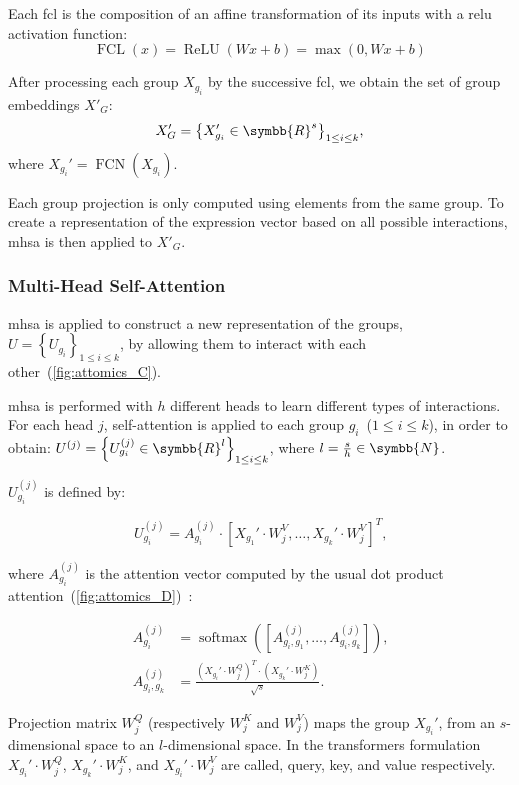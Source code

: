 \documentclass[../main.tex]{subfiles}
\begin{document}
			Each \gls{fcl} is the composition of an affine transformation of its inputs with a \gls{relu} activation function:
			\[ \operatorname{FCL}\left(x\right) = \operatorname{ReLU}\left(Wx+b \right) = \max\left(0, Wx+b\right) \]

			After processing each group \(X_{g_i}\) by the successive \gls{fcl}, we obtain the set of group embeddings \(X'_G\):
			\[ X_G' = {\left\{ X_{g_i}' \in \symbb{R}^{s}\right\}}_{1 \leq i \leq k} \text{,} \]
			where \(X_{g_i}' = \operatorname{FCN}\left(X_{g_i}\right)\).

			Each group projection is only computed using elements from the same group.
			To create a representation of the expression vector based on all possible interactions, \gls{mhsa} is then applied to \(X'_G\).

		\subsubsection{Multi-Head Self-Attention}

			\Gls{mhsa} is applied to construct a new representation of the groups, \(U = {\left\{ U_{g_i}\right\}}_{1 \leq i \leq k}\), by allowing them to interact with each other~(\cref{fig:attomics_C}).

			\Gls{mhsa} is performed with \(h\) different heads to learn different types of interactions.
			For each head \(j\), self-attention is applied to each group \(g_i\)~(\(1 \leq i \leq k \)), in order to obtain: \(U^{(j)} = {\left\{ U^{(j)}_{g_i} \in \symbb{R}^{l} \right\}}_{1 \leq i \leq k}\), where \(l = \frac{s}{h} \in \symbb{N}\).

			\(U^{(j)}_{g_i}\) is defined by:

			\[ U^{(j)}_{g_i} = A^{(j)}_{g_i} \cdot {\left[ X_{g_1}' \cdot W_j^V, \ldots ,  X_{g_k}' \cdot W_j^V\right]}^T \text{,}\]

			where \(A^{(j)}_{g_i}\) is the attention vector computed by the usual dot product attention~(\cref{fig:attomics_D})~\cite{vaswaniAttentionAllYou2017}:

			\begin{align*}
				A^{(j)}_{g_i}      & = \operatorname{softmax}\left(\left[A^{(j)}_{g_i,g_1}, \ldots,  A^{(j)}_{g_i,g_k}\right]\right) \text{,}  \\
				A^{(j)}_{g_i, g_k} & =  \frac{{\left(X_{g_i}' \cdot W_j^Q\right)}^T \cdot \left(X_{g_k}' \cdot W_j^K \right)}{\sqrt{s}} \text{.}
			\end{align*}

			Projection matrix \(W^Q_j\) (respectively \(W^K_j\) and \(W^V_j\)) maps the group \(X_{g_i}'\), from an \(s\)-dimensional space to an \(l\)-dimensional space.
			In the transformers formulation \(X_{g_i}' \cdot W_j^Q\), \(X_{g_k}' \cdot W^K_j\), and \(X_{g_i}' \cdot W^V_j\) are called, query, key, and value respectively.
\end{document}
